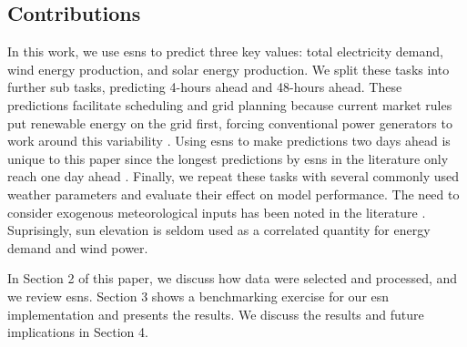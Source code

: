 \subsection{Contributions}
In this work, we use \glspl{esn} to predict three key values: total
electricity demand, wind energy production, and solar energy production. We
split these tasks into further sub tasks, predicting 4-hours ahead and 48-hours
ahead. These predictions facilitate scheduling and grid planning
because current market rules put renewable energy on the grid first, forcing
conventional power generators to work around this variability
\cite{wang_quantifying_2016}. Using \glspl{esn} to make predictions two days
ahead is unique to this paper since the longest predictions by \glspl{esn} in
the literature only reach one day ahead \cite{deihimi_application_2012}.
Finally, we repeat these tasks with several commonly used weather parameters
and evaluate their effect on model performance. The need to consider exogenous
meteorological inputs has been noted in the literature
\cite{chitsazan_wind_2019}. Suprisingly, sun elevation is
seldom used as a correlated quantity for energy demand and wind power.

In Section 2 of this paper, we discuss how data
were selected and processed, and we review \glspl{esn}. Section 3 shows a
benchmarking
exercise for our \gls{esn} implementation and presents the results. We discuss
the results and future implications in Section 4.

